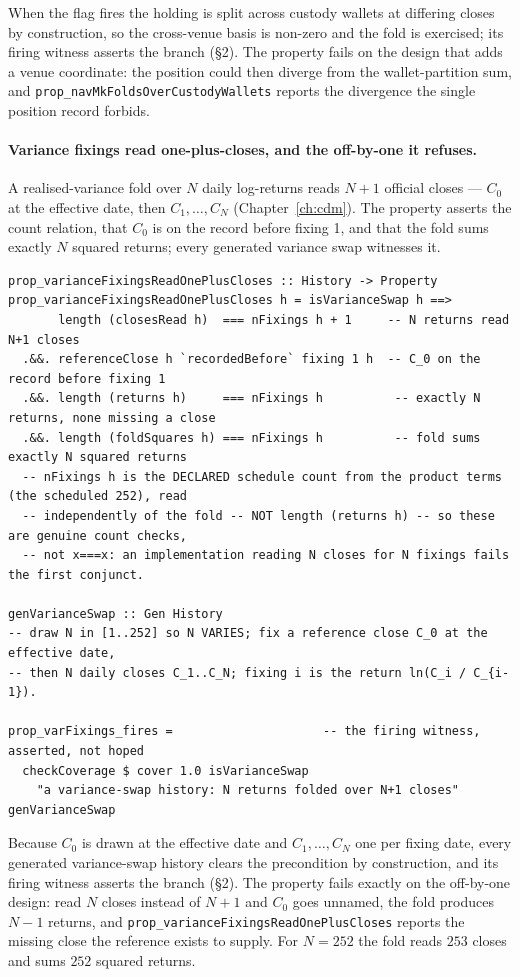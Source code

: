 \documentclass[11pt,a4paper]{article}
\begin{document}
When the flag fires the holding is split across custody wallets at differing closes by construction,
so the cross-venue basis is non-zero and the fold is exercised; its firing witness asserts the
branch (\S 2). The property fails on the
design that adds a venue coordinate: the position could then diverge from the wallet-partition sum,
and \texttt{prop\_navMkFoldsOverCustodyWallets} reports the divergence the single position record
forbids.

\paragraph{Variance fixings read one-plus-closes, and the off-by-one it refuses.}
A realised-variance fold over $N$ daily log-returns reads $N+1$ official closes ---
$C_0$ at the effective date, then $C_1,\dots,C_{N}$ (Chapter~\ref{ch:cdm}). The property
asserts the count relation, that $C_0$ is on the record before fixing 1, and that the fold
sums exactly $N$ squared returns; every generated variance swap witnesses it.

\begin{lstlisting}
prop_varianceFixingsReadOnePlusCloses :: History -> Property
prop_varianceFixingsReadOnePlusCloses h = isVarianceSwap h ==>
       length (closesRead h)  === nFixings h + 1     -- N returns read N+1 closes
  .&&. referenceClose h `recordedBefore` fixing 1 h  -- C_0 on the record before fixing 1
  .&&. length (returns h)     === nFixings h          -- exactly N returns, none missing a close
  .&&. length (foldSquares h) === nFixings h          -- fold sums exactly N squared returns
  -- nFixings h is the DECLARED schedule count from the product terms (the scheduled 252), read
  -- independently of the fold -- NOT length (returns h) -- so these are genuine count checks,
  -- not x===x: an implementation reading N closes for N fixings fails the first conjunct.

genVarianceSwap :: Gen History
-- draw N in [1..252] so N VARIES; fix a reference close C_0 at the effective date,
-- then N daily closes C_1..C_N; fixing i is the return ln(C_i / C_{i-1}).

prop_varFixings_fires =                     -- the firing witness, asserted, not hoped
  checkCoverage $ cover 1.0 isVarianceSwap
    "a variance-swap history: N returns folded over N+1 closes" genVarianceSwap
\end{lstlisting}

Because $C_0$ is drawn at the effective date and $C_1,\dots,C_N$ one per fixing
date, every generated variance-swap history clears the precondition by construction,
and its firing witness asserts the branch (\S 2). The property fails exactly on the off-by-one
design: read $N$ closes
instead of $N+1$ and $C_0$ goes unnamed, the fold produces $N-1$ returns, and
\texttt{prop\_varianceFixingsReadOnePlusCloses} reports the missing close the
reference exists to supply. For $N = 252$ the fold reads $253$ closes and sums $252$
squared returns.
\end{document}
